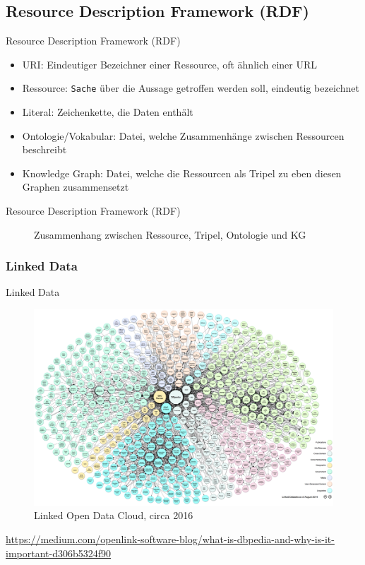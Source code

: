 \documentclass{beamer}              %
\begin{document}
\subsection{Resource Description Framework (RDF)}
\begin{frame}{Resource Description Framework (RDF)}
\begin{itemize}
    \item URI: Eindeutiger Bezeichner einer Ressource, oft ähnlich einer URL \cite{blumauer2006semantic}
    \item Ressource: \texttt{\dq Sache\dq} über die Aussage getroffen werden soll, eindeutig bezeichnet \cite{blumauer2006semantic}
    \item Literal: Zeichenkette, die Daten enthält
    \item Ontologie/Vokabular: Datei, welche Zusammenhänge zwischen Ressourcen beschreibt \cite{staab2009handbook}
    \item Knowledge Graph: Datei, welche die Ressourcen als Tripel zu eben diesen Graphen zusammensetzt \cite{staab2009handbook}
\end{itemize}
\end{frame}

\begin{frame}{Resource Description Framework (RDF)}
\begin{figure}[htbp]
  \centering
  
  \caption{Zusammenhang zwischen Ressource, Tripel, Ontologie und KG}
\end{figure}
\end{frame}

\subsubsection{Linked Data}
\begin{frame}{Linked Data}
\begin{figure}[htbp]
  \centering
  \includegraphics[width=0.55\paperwidth]{images/linked-data.png}
  \caption{Linked Open Data Cloud, circa 2016}
\end{figure}
\url{https://medium.com/openlink-software-blog/what-is-dbpedia-and-why-is-it-important-d306b5324f90}
\end{frame}
\end{document}
